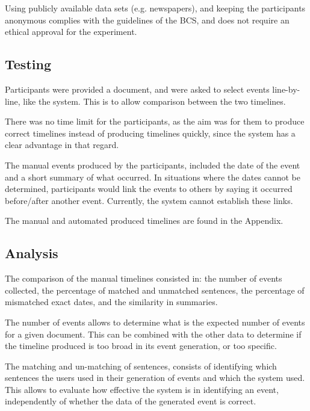 \par Using publicly available data sets (e.g. newspapers), and keeping the participants anonymous complies with the guidelines of the BCS, and does not require an ethical approval for the experiment.

\subsection{Testing}
\par Participants were provided a document, and were asked to select events line-by-line, like the system. This is to allow comparison between the two timelines. 

\par There was no time limit for the participants, as the aim was for them to produce correct timelines instead of producing timelines quickly, since the system has a clear advantage in that regard.

\par The manual events produced by the participants, included the date of the event and a short summary of what occurred. In situations where the dates cannot be determined, participants would link the events to others by saying it occurred before/after another event. Currently, the system cannot establish these links.

\par The manual and automated produced timelines are found in the Appendix.

\subsection{Analysis}
\par The comparison of the manual timelines consisted in: the number of events collected, the percentage of matched and unmatched sentences, the percentage of mismatched exact dates, and the similarity in summaries. 

\par The number of events allows to determine what is the expected number of events for a given document. This can be combined with the other data to determine if the timeline produced is too broad in its event generation, or too specific.

\par The matching and un-matching of sentences, consists of identifying which sentences the users used in their generation of events and which the system used. This allows to evaluate how effective the system is in identifying an event, independently of whether the data of the generated event is correct.

